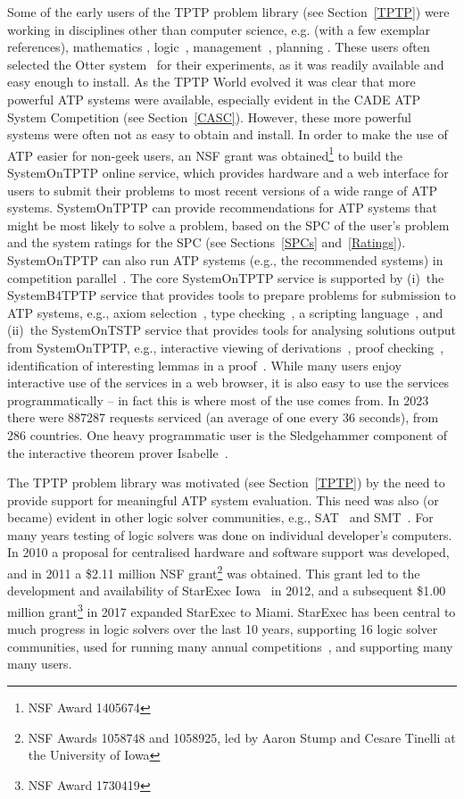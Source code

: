 \documentclass{easychair}
\begin{document}
Some of the early users of the TPTP problem library (see Section~\ref{TPTP}) were working in
disciplines other than computer science, e.g. (with a few exemplar references), mathematics 
\cite{Qua92-Book,MP96}, logic~\cite{GO86,Jec95}, management~\cite{PB+92-TR,PM94}, planning 
\cite{SE94}.
These users often selected the Otter system~\cite{McC03-Otter} for their experiments, as
it was readily available and easy enough to install. 
As the TPTP World evolved it was clear that more powerful ATP systems were available, especially 
evident in the CADE ATP System Competition (see Section~\ref{CASC}).
However, these more powerful systems were often not as easy to obtain and install.
In order to make the use of ATP easier for non-geek users, an NSF grant was obtained\footnote{%
NSF Award 1405674} to build the SystemOnTPTP online service, which provides hardware and a web 
interface for users to submit their problems to most recent versions of a wide range of ATP 
systems.
SystemOnTPTP can provide recommendations for ATP systems that might be most likely to solve
a problem, based on the SPC of the user's problem and the system ratings for the SPC
(see Sections~\ref{SPCs} and~\ref{Ratings}). 
SystemOnTPTP can also run ATP systems (e.g., the recommended systems) in competition
parallel~\cite{SS99-FLAIRS}.
The core SystemOnTPTP service is supported by (i)~the SystemB4TPTP service that provides tools to
prepare problems for submission to ATP systems, e.g., axiom selection~\cite{HV11}, type 
checking~\cite{KSR16}, a scripting language~\cite{Sut14}, and (ii)~the SystemOnTSTP service that 
provides tools for analysing solutions output from SystemOnTPTP, 
e.g., interactive viewing of derivations~\cite{TPS07}, proof checking~\cite{Sut06}, identification 
of interesting lemmas in a proof~\cite{PGS06}.
While many users enjoy interactive use of the services in a web browser, it is also easy to use 
the services programmatically -- in fact this is where most of the use comes from.
In 2023 there were 887287 requests serviced (an average of one every 36 seconds), from 286 
countries.
One heavy programmatic user is the Sledgehammer component of the interactive theorem prover
Isabelle~\cite{PB10}.

The TPTP problem library was motivated (see Section~\ref{TPTP}) by the need to provide support
for meaningful ATP system evaluation.
This need was also (or became) evident in other logic solver communities, e.g., 
SAT~\cite{HS00-SATLIB} and SMT~\cite{CSW15}.
For many years testing of logic solvers was done on individual developer's computers. 
In 2010 a proposal for centralised hardware and software support was developed,
and in 2011 a \$2.11 million NSF grant\footnote{%
NSF Awards 1058748 and 1058925, led by Aaron Stump and Cesare Tinelli at the University of Iowa} 
was obtained.
This grant led to the development and availability of StarExec Iowa~\cite{SST14} in 2012,
and a subsequent \$1.00 million grant\footnote{%
NSF Award 1730419} in 2017 expanded StarExec to Miami.
StarExec has been central to much progress in logic solvers over the last 10 years, supporting
16 logic solver communities, used for running many annual competitions~\cite{BB+19}, and 
supporting many many users.
\end{document}
